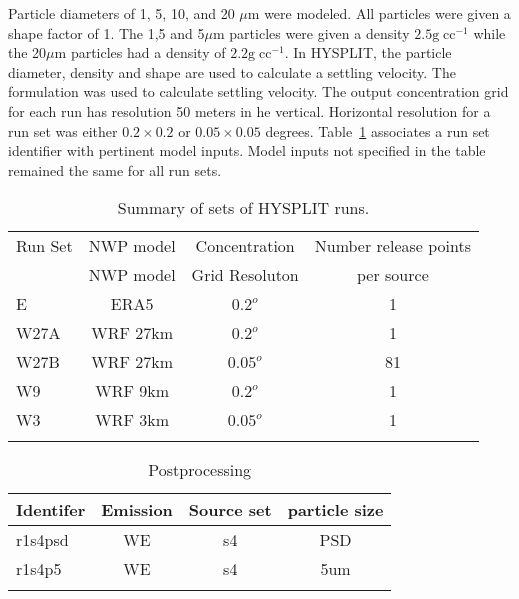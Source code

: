 
Particle diameters of 1, 5, 10, and 20 $\mu\mathrm{m}$ were modeled. All particles were given a shape factor of 1.
The 1,5 and 5$\mu\mathrm{m}$ particles were given a density $2.5\mathrm{g}\;\mathrm{cc}^{-1}$ while the 20$\mu\mathrm{m}$ particles had a density of 
$2.2\mathrm{g}\;\mathrm{cc}^{-1}$. In HYSPLIT, the particle diameter, density and shape are used
to calculate a settling velocity. The ~\cite{Ganser93, dare} formulation was used to calculate settling velocity.
The output concentration grid for each run has resolution 50 meters in he vertical. Horizontal resolution for a run set was  either $0.2 \times 0.2$ or $0.05 \times 0.05$ degrees.
Table~\ref{tab:runs} associates a run set identifier with pertinent model inputs.
Model inputs not specified in the table remained the same for all run sets.


 \begin{table}
 \caption{Summary of sets of HYSPLIT runs.}
 \centering
 \begin{tabular}{l c c c}
 \hline
  Run Set  & NWP model & Concentration  & Number release points  \\
   & NWP model & Grid Resoluton & per source \\
 \hline
   E     & ERA5    & $0.2^o$  & 1  \\
   W27A  & WRF 27km& $0.2^o$  & 1  \\
   W27B  & WRF 27km& $0.05^o$ & 81 \\
   W9    & WRF 9km & $0.2^o$  & 1  \\
   W3    & WRF 3km & $0.05^o$ & 1  \\
 \hline
 \label{tab:runs}
 \end{tabular}
 \end{table}

\begin{table}
 \caption{Postprocessing}
 \centering
 \begin{tabular}{l c c c}
 \hline
  Identifer & Emission & Source set  & particle size  \\
 \hline
r1s4psd & WE & s4 & PSD \\ 
r1s4p5 & WE & s4 & 5um  \\

 \hline
 \label{tab:results}
 \end{tabular}
 \end{table}

